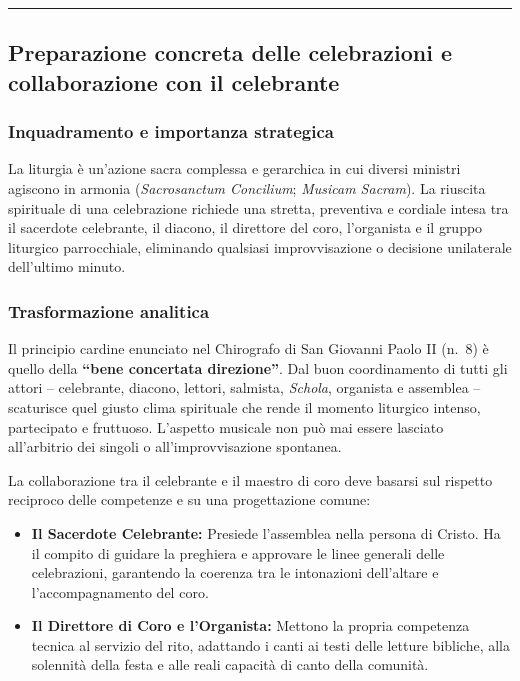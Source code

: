 \documentclass[12pt,a4paper]{article}
\begin{document}
	\begin{center}\rule{0.5\linewidth}{0.5pt}\end{center}
	
	\subsection{Preparazione concreta delle celebrazioni e collaborazione con il celebrante}\label{preparazione-concreta-delle-celebrazioni-e-collaborazione-con-il-celebrante}
	
	\subsubsection{Inquadramento e importanza strategica}\label{inquadramento-e-importanza-strategica-12}
	
	La liturgia è un'azione sacra complessa e gerarchica in cui diversi ministri agiscono in armonia (\emph{Sacrosanctum Concilium}; \emph{Musicam Sacram}). La riuscita spirituale di una celebrazione richiede una stretta, preventiva e cordiale intesa tra il sacerdote celebrante, il diacono, il direttore del coro, l'organista e il gruppo liturgico parrocchiale, eliminando qualsiasi improvvisazione o decisione unilaterale dell'ultimo minuto.
	
	\subsubsection{Trasformazione analitica}\label{trasformazione-analitica-13}
	
	Il principio cardine enunciato nel Chirografo di San Giovanni Paolo II (n.~8) è quello della \textbf{``bene concertata direzione''}. Dal buon coordinamento di tutti gli attori -- celebrante, diacono, lettori, salmista, \emph{Schola}, organista e assemblea -- scaturisce quel giusto clima spirituale che rende il momento liturgico intenso, partecipato e fruttuoso. L'aspetto musicale non può mai essere lasciato all'arbitrio dei singoli o all'improvvisazione spontanea.
	
	La collaborazione tra il celebrante e il maestro di coro deve basarsi sul rispetto reciproco delle competenze e su una progettazione comune:
	
	\begin{itemize}[leftmargin=*]
		\item \textbf{Il Sacerdote Celebrante:} Presiede l'assemblea nella persona di Cristo. Ha il compito di guidare la preghiera e approvare le linee generali delle celebrazioni, garantendo la coerenza tra le intonazioni dell'altare e l'accompagnamento del coro.
		\item \textbf{Il Direttore di Coro e l'Organista:} Mettono la propria competenza tecnica al servizio del rito, adattando i canti ai testi delle letture bibliche, alla solennità della festa e alle reali capacità di canto della comunità.
	\end{itemize}
	
\end{document}
